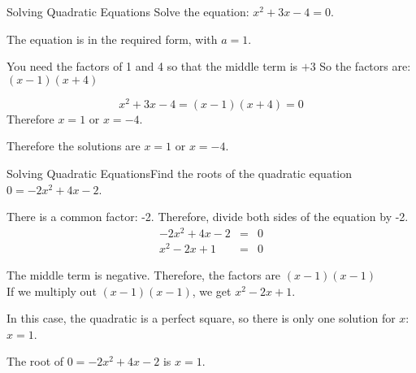 \documentclass[10pt,a4paper,titlepage,twoside,openright]{report}
\begin{document}
\begin{wex}{Solving Quadratic Equations}
{Solve the equation: $x^{2} + 3x - 4=0$.}{
The equation is in the required form, with $a=1$.

You need the factors of 1 and 4 so that the middle term is $+3$
So the factors are:\\
$(x-1)(x+4)$

\begin{equation}
x^{2} + 3x - 4 = (x - 1)(x + 4) = 0
\end{equation}
Therefore $x=1$ or $x=-4$.

Therefore the solutions are $x = 1$ or $x = -4$.}
\end{wex}


\begin{wex}{Solving Quadratic Equations}{Find the roots of the quadratic
equation $0 = -2x^{2} + 4x - 2$.}
{
There is a common factor: -2.
Therefore, divide both sides of the equation by -2.
\begin{eqnarray*}
-2x^{2} + 4x - 2 &=&0 \\
x^2 -2x +1 &=&0
\end{eqnarray*}

The middle term is negative. Therefore, the factors are $(x-1)(x-1)$\\
If we multiply out $(x-1)(x-1)$, we get $x^2-2x+1$.

In this case, the quadratic is a perfect square, so there is only one solution
for $x$: $x=1$.

The root of $0 = -2x^{2} + 4x - 2$ is $x = 1$.}
\end{wex}
\end{document}
